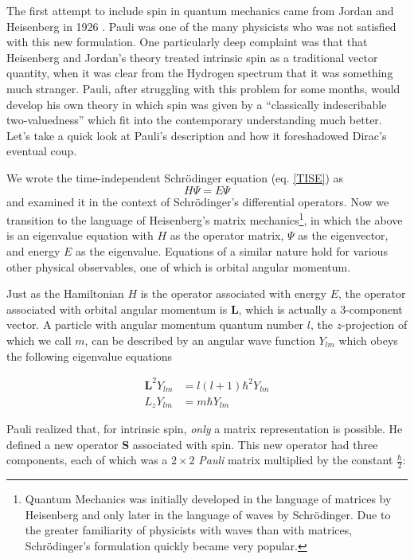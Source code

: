 \documentclass[a4paper,12pt]{book}
\begin{document}
The first attempt to include spin in quantum mechanics came from Jordan and Heisenberg in 1926 \cite{jordan}. Pauli was one of the many physicists who was not satisfied with this new formulation. One particularly deep complaint was that that Heisenberg and Jordan's theory treated intrinsic spin as a traditional vector quantity, when it was clear from the Hydrogen spectrum that it was something much stranger. Pauli, after struggling with this problem for some months, would develop his own theory\cite{pauli:spin} in which spin was given by a ``classically indescribable two-valuedness'' which fit into the contemporary understanding much better. Let's take a quick look at Pauli's description and how it foreshadowed Dirac's eventual coup.

We wrote the time-independent Schr\"{o}dinger equation (eq. \ref{TISE}) as
\begin{equation}
 H\Psi=E\Psi
\end{equation}
and examined it in the context of Schr\"{o}dinger's differential operators. Now we transition to the language of Heisenberg's matrix mechanics\footnote{Quantum Mechanics was initially developed in the language of matrices by Heisenberg and only later in the language of waves by Schr\"{o}dinger. Due to the greater familiarity of physicists with waves than with matrices, Schr\"{o}dinger's formulation quickly became very popular.}, in which the above is an eigenvalue equation with $H$ as the operator matrix, $\Psi$ as the eigenvector, and energy $E$ as the eigenvalue. Equations of a similar nature hold for various other physical observables, one of which is orbital angular momentum.

Just as the Hamiltonian $H$ is the operator associated with energy $E$, the operator associated with orbital angular momentum is $\mathbf{L}$, which is actually a 3-component vector. A particle with angular momentum quantum number $l$, the $z$-projection of which we call $m$, can be described by an angular wave function $Y_{lm}$ which obeys the following eigenvalue equations

\begin{subequations}\label{grp}
\begin{align}
\mathbf{L}^{2}Y_{lm}&=l(l+1)\hbar^{2}Y_{lm}\label{first}\\
L_{z}Y_{lm}&=m\hbar Y_{lm} \label{second}
\end{align}
\end{subequations}

Pauli realized that, for intrinsic spin, \emph{only} a matrix representation is possible. He defined a new operator $\mathbf{S}$ associated with spin. This new operator had three components, each of which was a $2\times 2$ \emph{Pauli} matrix multiplied by the constant $\frac{\hbar}{2}$:
\end{document}
